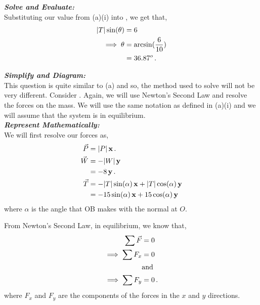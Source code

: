 \begin{subquestions}
\begin{subsubquestions}
\subsubquestion

\textbf{\textit{Solve and Evaluate:}} \\
Substituting our value from (a)(i) into , we get that,
\begin{align}
	|T|\sin(\theta) & = 6 \nonumber \\
	\implies \theta & = \arcsin(\frac{6}{10}) \nonumber \\
	                & = 36.87^o \,.
\end{align}
	
\end{subsubquestions}


\subquestion

\begin{subsubquestions}
	
\subsubquestion

\textbf{\textit{Simplify and Diagram:}} \\
This question is quite similar to (a) and so, the method used to solve will not be very different. Consider . Again, we will use Newton's Second Law and resolve the forces on the mass. We will use the same notation as defined in (a)(i) and we will assume that the system is in equilibrium.\\





\textbf{\textit{Represent Mathematically:}} \\ 
We will first resolve our forces as,
\begin{align}
	\vec{P} & = |P|\,\mathbf{x} \,. \\ 
	\vec{W} & = -|W|\,\mathbf{y} \nonumber \\
			& = -8\,\mathbf{y} \,. \\ 
	\vec{T} & = -|T|\sin(\alpha)\,\mathbf{x} + |T|\cos(\alpha)\,\mathbf{y} \nonumber \\
	        & = -15\sin(\alpha)\,\mathbf{x} + 15\cos(\alpha)\,\mathbf{y}
\end{align}
where $\alpha$ is the angle that OB makes with the normal at $O$.
	
From Newton's Second Law, in equilibrium, we know that,
\begin{align}
	\sum \vec{F} & = 0 \nonumber \\
	\implies \sum F_x & = 0 \label{2010:q6:ForceX2} \\
	& \text{and} \nonumber \\
	\implies \sum F_y & = 0 \label{2010:q6:ForceY2} \,.
\end{align}
where $F_x$ and $F_y$ are the components of the forces in the $x$ and $y$ directions.\\
	




\end{subsubquestions}
\end{subquestions}

